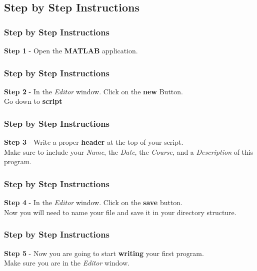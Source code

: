 \documentclass[fleqn]{beamer} %
\newcommand{\sectionIIIsubsectionIIItitle}{Step by Step Instructions}
\begin{document}
		\subsection{\sectionIIIsubsectionIIItitle}\label{sectionIIIsubsectionIII}

			\begin{frame}
				\frametitle{\sectionIIIsubsectionIIItitle}
				\bigskip

				\textbf{Step 1} - Open the {\bf MATLAB} application.
				
				\btVFill
			\end{frame}

			\begin{frame}
				\frametitle{\sectionIIIsubsectionIIItitle}
				\bigskip

				\textbf{Step 2} - In the {\it Editor} window. Click on the {\bf new } Button. \vspace{3mm}\\ \hspace*{12mm}Go down to {\bf script}
				
				\btVFill
			\end{frame}

			\begin{frame}
				\frametitle{\sectionIIIsubsectionIIItitle}
				\bigskip

				\textbf{Step 3} - Write a proper {\bf header} at the top of your script. \vspace{3mm}\\ Make sure to include your {\it Name}, the {\it Date}, the {\it Course}, and a {\it Description} of this program.
				
				\btVFill
			\end{frame}

			\begin{frame}
				\frametitle{\sectionIIIsubsectionIIItitle}
				\bigskip

				\textbf{Step 4} - In the {\it Editor} window. Click on the {\bf save} button. \vspace{3mm}\\ Now you will need to name your file and save it in your directory structure.
				
				\btVFill
			\end{frame}

			\begin{frame}
				\frametitle{\sectionIIIsubsectionIIItitle}
				\bigskip

				\textbf{Step 5} - Now you are going to start {\bf writing} your first program. \vspace{3mm}\\ Make sure you are in the {\it Editor} window.
				
				\btVFill
			\end{frame}
\end{document}

